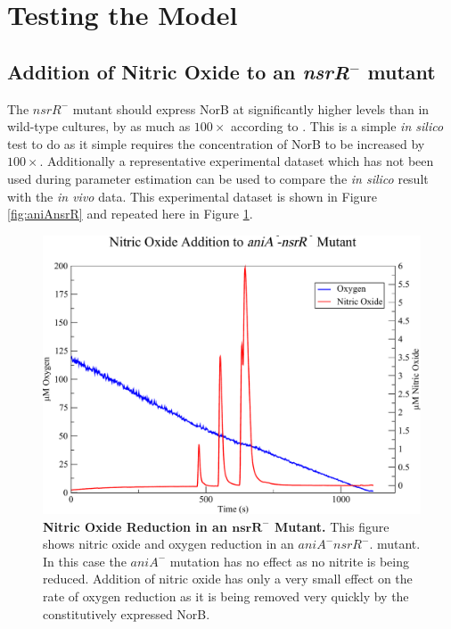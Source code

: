 \section{Testing the Model}
\subsection{\texorpdfstring{Addition of Nitric Oxide to an \textit{nsrR}$^-$ mutant}{Addition of Nitric Oxide to an nsrR- mutant}}
The $nsrR^-$ mutant should express NorB at significantly higher levels than in wild-type cultures, by as much as $100\times$ according to \citet{Rock2007}. This is a simple \textit{in silico} test to do as it simple requires the concentration of NorB to be increased by $100\times$. Additionally a representative experimental dataset which has not been used during parameter estimation can be used to compare the \textit{in silico} result with the \textit{in vivo} data. This experimental dataset is shown in Figure \ref{fig:aniAnsrR} and repeated here in Figure \ref{fig:aniAnsrR1}.
\begin{figure}[tbp]
 \centering
 \includegraphics[width=15cm, clip=true]{./09-completedmodel/data/aniA-nsrR.pdf}
 \caption[{Nitric Oxide Reduction in an nsrR Mutant.}]{{\bf Nitric Oxide Reduction in an $\mathbf{nsrR}^-$ Mutant.} This figure shows nitric oxide and oxygen reduction in an $aniA^-nsrR^-$. mutant. In this case the $aniA^-$ mutation has no effect as no nitrite is being reduced. Addition of nitric oxide has only a very small effect on the rate of oxygen reduction as it is being removed very quickly by the constitutively expressed NorB.}
 \label{fig:aniAnsrR1}
\end{figure}
